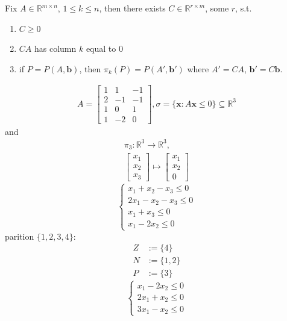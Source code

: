 \documentclass[a4paper,12pt]{amsart}
\newcommand{\RR}{\mathbb{R}}
\newcommand{\bfx}{\mathbf{x}}
\newcommand{\bfb}{\mathbf{b}}
\begin{document}
\begin{Theorem}
\label{Thm_FM}
Fix $A\in\RR^{m\times n}$, $1\leq k\leq n$, then there exists $C\in\RR^{r\times m}$, some $r$, s.t.
\begin{enumerate}
\item $C\geq 0$
\item $CA$ has column $k$ equal to $0$
\item  if $P=P(A,\bfb)$, then $\pi_k(P)=P(A',\bfb')$ where $A'=CA$, $\bfb'=C\bfb$.
\end{enumerate}
\end{Theorem}
\begin{Eg}
\begin{align*}
A=\begin{bmatrix}
1&1&-1\\
2&-1&-1\\
1&0&1\\
1&-2&0
\end{bmatrix},\sigma=\{\bfx: A\bfx\leq 0\}\subseteq\RR^3
\end{align*}
and
\begin{align*}
\pi_3:\RR^3\rightarrow\RR^3,\\
\begin{bmatrix}
x_1\\x_2\\x_3
\end{bmatrix}\mapsto\begin{bmatrix}
x_1\\x_2\\0
\end{bmatrix}
\end{align*}
\begin{equation}
\label{eqn*}
\begin{cases}
x_1+x_2-x_3\leq 0\\
2x_1-x_2-x_3\leq 0\\
x_1+x_3\leq 0\\
x_1-2x_2\leq 0
\end{cases}
\end{equation}
parition $\{1,2,3,4\}$:
\begin{align*}
Z&:=\{4\}\\
N&:=\{1,2\}\\
P&:=\{3\}
\end{align*}
\begin{equation}
\label{eqn**}
\begin{cases}
x_1-2x_2\leq 0\\
2x_1+x_2\leq 0\\
3x_1-x_2\leq 0

\end{cases}
\end{equation}
\end{Eg}
\end{document}
